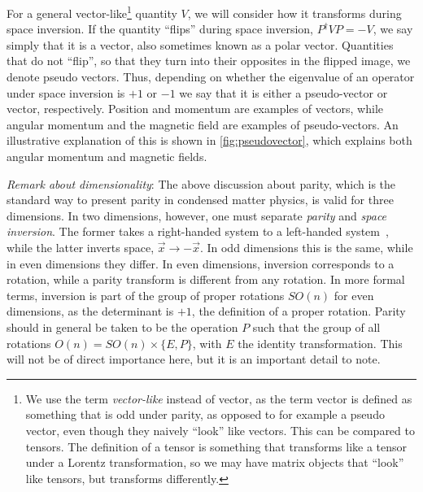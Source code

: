 For a general vector-like\footnote{We use the term \emph{vector-like} instead of vector, as the term vector is defined as something that is odd under parity, as opposed to for example a pseudo vector, even though they naively ``look'' like vectors. This can be compared to tensors. The definition of a tensor is something that transforms like a tensor under a Lorentz transformation, so we may have matrix objects that ``look'' like tensors, but transforms differently.} quantity $V$, we will consider how it transforms during space inversion.
If the quantity ``flips'' during space inversion, $P^\dagger V P = -V$, we say simply that it is a vector, also sometimes known as a polar vector.
Quantities that do not ``flip'', so that they turn into their opposites in the flipped image, we denote pseudo vectors.
Thus, depending on whether the eigenvalue of an operator under space inversion is $+1$ or $-1$ we say that it is either a pseudo-vector or vector, respectively.
Position and momentum are examples of vectors, while angular momentum and the magnetic field are examples of pseudo-vectors.
An illustrative explanation of this is shown in \cref{fig:pseudovector}, which explains both angular momentum and magnetic fields.

\emph{Remark about dimensionality}: The above discussion about parity, which is the standard way to present parity in condensed matter physics, is valid for three dimensions.
In two dimensions, however, one must separate \emph{parity} and \emph{space inversion}.
The former takes a right-handed system to a left-handed system~\cite{sakuraiModernQuantumMechanics2017}, while the latter inverts space, $\vec{x} \to  -\vec{x}$.
In odd dimensions this is the same, while in even dimensions they differ.
In even dimensions, inversion corresponds to a rotation, while a parity transform is different from any rotation.
In more formal terms, inversion is part of the group of proper  rotations $SO(n)$ for even dimensions, as the determinant is $+1$, the definition of a proper rotation.
Parity should in general be taken to be the operation $P$ such that the group of all rotations $O(n) = SO(n) \times \{E, P\}$, with $E$ the identity transformation.
This will not be of direct importance here, but it is an important detail to note.

